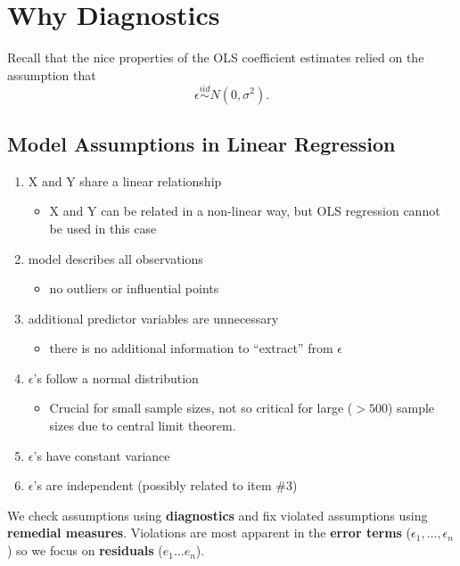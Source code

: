 \documentclass[12pt]{../notes}
\begin{document}

\section{Why Diagnostics}

Recall that the nice properties of the OLS coefficient estimates relied on the assumption that \[\epsilon \stackrel{iid}{\sim} N(0, \sigma^2).\]

\subsection*{Model Assumptions in Linear Regression}
\begin{enumerate}
\item X and Y share a linear relationship
\begin{itemize}
\item X and Y can be related in a non-linear way, but OLS regression cannot be used in this case
\end{itemize}
\item model describes all observations 
\begin{itemize}
\item no outliers or influential points
\end{itemize}
\item additional predictor variables are unnecessary
\begin{itemize}
\item there is no additional information to ``extract'' from $\epsilon$
\end{itemize}
\item $\epsilon$'s follow a normal distribution
\begin{itemize}
\item Crucial for small sample sizes, not so critical for large ($> 500$) sample sizes due to central limit theorem. 
\end{itemize}
\item $\epsilon$'s have constant variance
\item $\epsilon$'s are independent (possibly related to item \#3)
\end{enumerate}

We check assumptions using \textbf{diagnostics} and fix violated assumptions using \textbf{remedial measures}. Violations are most apparent in the \textbf{error terms} ($\epsilon_1, \ldots, \epsilon_n$) so we focus on \textbf{residuals} ($e_1 \ldots e_n$). 
\end{document}
